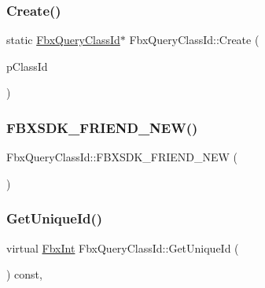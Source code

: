 \subsubsection{\texorpdfstring{Create()}{Create()}}
{\footnotesize\ttfamily static \hyperlink{class_fbx_query_class_id}{Fbx\+Query\+Class\+Id}$\ast$ Fbx\+Query\+Class\+Id\+::\+Create (\begin{DoxyParamCaption}\item[{const \hyperlink{class_fbx_class_id}{Fbx\+Class\+Id} \&}]{p\+Class\+Id }\end{DoxyParamCaption})\hspace{0.3cm}{\ttfamily [static]}}

\mbox{\label{class_fbx_query_class_id_a2693a06ca55fe4fdd0bf3dacc986be0f}} 
\subsubsection{\texorpdfstring{F\+B\+X\+S\+D\+K\+\_\+\+F\+R\+I\+E\+N\+D\+\_\+\+N\+E\+W()}{FBXSDK\_FRIEND\_NEW()}}
{\footnotesize\ttfamily Fbx\+Query\+Class\+Id\+::\+F\+B\+X\+S\+D\+K\+\_\+\+F\+R\+I\+E\+N\+D\+\_\+\+N\+EW (\begin{DoxyParamCaption}{ }\end{DoxyParamCaption})}

\mbox{\label{class_fbx_query_class_id_a9460258f2525b83b7e81f87a3bcc2c61}} 
\subsubsection{\texorpdfstring{Get\+Unique\+Id()}{GetUniqueId()}}
{\footnotesize\ttfamily virtual \hyperlink{fbxtypes_8h_a088fa96de3b0b3ea69f0f6afef525dfb}{Fbx\+Int} Fbx\+Query\+Class\+Id\+::\+Get\+Unique\+Id (\begin{DoxyParamCaption}{ }\end{DoxyParamCaption}) const\hspace{0.3cm}{\ttfamily [inline]}, {\ttfamily [virtual]}}



